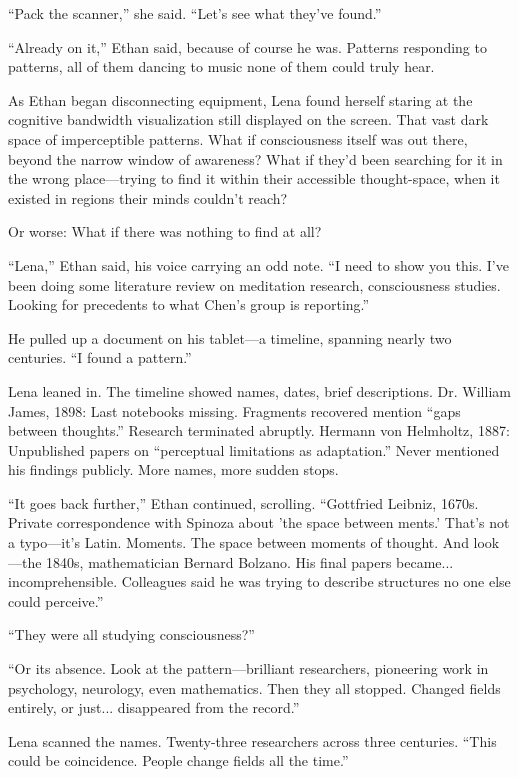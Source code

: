 ``Pack the scanner,'' she said. ``Let's see what they've found.''

``Already on it,'' Ethan said, because of course he was. Patterns responding to patterns, all of them dancing to music none of them could truly hear.

As Ethan began disconnecting equipment, Lena found herself staring at the cognitive bandwidth visualization still displayed on the screen. That vast dark space of imperceptible patterns. What if consciousness itself was out there, beyond the narrow window of awareness? What if they'd been searching for it in the wrong place—trying to find it within their accessible thought-space, when it existed in regions their minds couldn't reach?

Or worse: What if there was nothing to find at all?

``Lena,'' Ethan said, his voice carrying an odd note. ``I need to show you this. I've been doing some literature review on meditation research, consciousness studies. Looking for precedents to what Chen's group is reporting.''

He pulled up a document on his tablet—a timeline, spanning nearly two centuries. ``I found a pattern.''

Lena leaned in. The timeline showed names, dates, brief descriptions. Dr. William James, 1898: Last notebooks missing. Fragments recovered mention ``gaps between thoughts.'' Research terminated abruptly. Hermann von Helmholtz, 1887: Unpublished papers on ``perceptual limitations as adaptation.'' Never mentioned his findings publicly. More names, more sudden stops.

``It goes back further,'' Ethan continued, scrolling. ``Gottfried Leibniz, 1670s. Private correspondence with Spinoza about 'the space between ments.' That's not a typo—it's Latin. Moments. The space between moments of thought. And look—the 1840s, mathematician Bernard Bolzano. His final papers became... incomprehensible. Colleagues said he was trying to describe structures no one else could perceive.''

``They were all studying consciousness?''

``Or its absence. Look at the pattern—brilliant researchers, pioneering work in psychology, neurology, even mathematics. Then they all stopped. Changed fields entirely, or just... disappeared from the record.''

Lena scanned the names. Twenty-three researchers across three centuries. ``This could be coincidence. People change fields all the time.''

